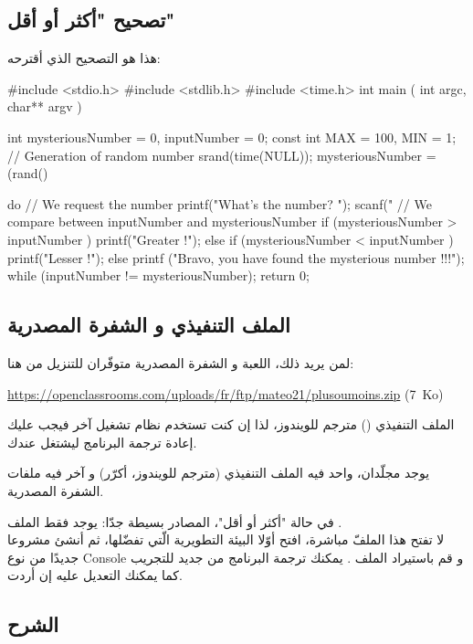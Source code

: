 \subsection{تصحيح "أكثر أو أقل"}

 هذا هو التصحيح الذي أقترحه:
 
\begin{Csource}
#include <stdio.h>
#include <stdlib.h>
#include <time.h>
int main ( int argc, char** argv )
{
	int mysteriousNumber = 0, inputNumber = 0;
	const int MAX = 100, MIN = 1;
	// Generation of random number
	srand(time(NULL));
	mysteriousNumber = (rand() %
	
	do
	{
		// We request the number
		printf("What's the number? ");
		scanf("%
		// We compare between inputNumber and mysteriousNumber
		if (mysteriousNumber > inputNumber )
		printf("Greater !\n\n");
		else if (mysteriousNumber < inputNumber )
		printf("Lesser !\n\n");
		else
		printf ("Bravo, you have found the mysterious number !!!\n\n");
	} while (inputNumber != mysteriousNumber);
	return 0;
}
\end{Csource}

\subsection{الملف التنفيذي و الشفرة المصدرية}

 لمن يريد ذلك، اللعبة و الشفرة المصدرية متوفّران للتنزيل من هنا:

\textenglish{\url{https://openclassrooms.com/uploads/fr/ftp/mateo21/plusoumoins.zip} \mbox{(7 Ko)}}

\begin{information}
الملف التنفيذي 
()
مترجم للويندوز، لذا إن كنت تستخدم نظام تشغيل آخر فيجب عليك إعادة ترجمة البرنامج ليشتغل عندك.
\end{information}

يوجد مجلّدان، واحد فيه الملف التنفيذي (مترجم للويندوز، أكرّر) و آخر فيه ملفات الشفرة المصدرية.

في حالة "أكثر أو أقل"، المصادر بسيطة جدّا: يوجد فقط الملف
.\\
لا تفتح هذا الملفّ مباشرة، افتح أوّلا البيئة التطويرية الّتي تفضّلها، ثم أنشئ مشروعا جديدًا من نوع 
\textenglish{Console}
و قم باستيراد الملف 
.
يمكنك ترجمة البرنامج من جديد للتجريب كما يمكنك التعديل عليه إن أردت.

\subsection{الشرح}

